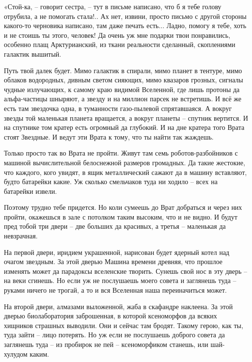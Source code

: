 \documentclass[ebook,oneside,final,openright]{memoir}
\begin{document}
\par
«Стой-ка, – говорит сестра, – тут в письме написано, что б я тебе голову отрубила, а не помогать стала!.. Ах нет, извини, просто письмо с другой стороны какого-то черновика написано, там даже печать есть... Ладно, помогу я тебе, хоть и не стоишь ты этого, человек! Да очень уж мне подарки твои понравились, особенно плащ Арктурианский, из ткани реальности сделанный, скоплениями галактик вышитый.\par
\par
Путь твой далек будет. Мимо галактик в спирали, мимо планет в тентуре, мимо облаков водородных, дивным светом сияющих, мимо квазаров грозных, сигналы чудные излучающих, к самому краю видимой Вселенной, где лишь протоны да альфа-частицы шныряют, а звезду и на миллион парсек не встретишь. И всё же есть там звездочка одна, в туманности газо-пылевой спрятавшаяся. А вокруг звезды той маленькая планета вращается, а вокруг планеты – спутник вертится. И на спутнике том кратер есть огромный да глубокий. И на дне кратера того Врата стоят Звездные. И ведут эти Врата к тому, что ты найти так жаждешь.\par
\par
Только просто так во Врата не пройти. Живут там семь роботов-разбойников с машиной вычислительной белоснежной размеров громадных. Да такие жестокие, что каждого, кого увидят, в ящик металлический сажают да в машину вставляют, будто батарейки какие. Уж сколько смельчаков туда ни ходило – всех на батарейки извели.\par
\par
Поэтому трудно тебе придется. Но коли сумеешь до Врат добраться и через них пройти, окажешься в зале с потолком таким высоким, что и не видно. И будут пред тобой три двери – две больших да красивых, а третья – маленькая да невзрачная.\par
\par
На первой двери, иридием украшенной, нарисован будет ядерный котел над очагом звездным. За этой дверью Машина времени древняя, что прошлое изменять может да парадоксы вселенские творить. Сунешь свой нос в эту дверь – на веки сгинешь. Но если уж не послушаешь моего совета и заглянешь туда – руками ничего не трогай, а то и вся Вселенная наша переиначиться может.\par
\par
На второй двери, алмазами выложенной, жаба в скафандре наклеена. За этой дверью биолаборатория заброшенная, в которой ксеноморфов да всяких хищников страшных выводили. Они и сейчас там бродят. Такому герою, как ты, туда зайти – лицо потерять. Но уж если не послушаешь доброго совета да заглянешь туда – из пробирок не пей – ксеноморфиком станешь, или шай-хулудом каким.\par
\end{document}
